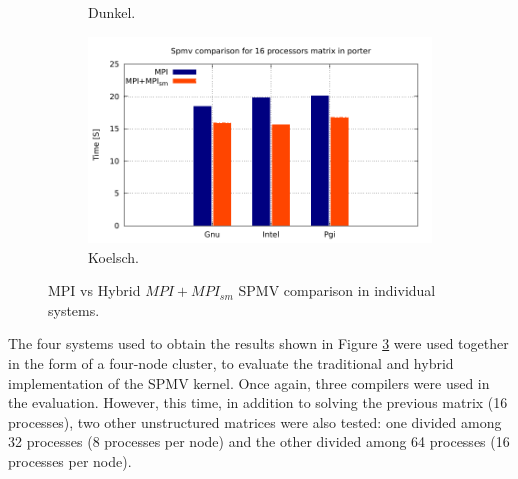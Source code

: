 \begin{figure} [h!]
\begin{subfigure}{.6\textwidth}
      \caption[]{Dunkel.}
      \label{fig:HybridDunkel}
    \end{subfigure}%
    \begin{subfigure}{.6\textwidth}
      \centering
      \hspace*{-1.5cm} 
      \includegraphics[page=4, width=0.95\linewidth]{Plots/HybridProgramming/spmvIndividual.pdf}
      \caption{Koelsch.}
      \label{fig:HybridKoelsh}
    \end{subfigure}
\caption{MPI vs Hybrid $MPI+MPI_{sm}$ SPMV comparison in individual systems.}
\label{fig:spmvIndividual}
\end{figure}


\medskip

The four systems used to obtain the results shown in Figure \ref{fig:spmvIndividual} were used together in the form of a four-node cluster, to evaluate the traditional and hybrid implementation of the SPMV kernel. Once again, three compilers were used in the evaluation. However, this time, in addition to solving the previous matrix (16 processes), two other unstructured matrices were also tested: one divided among 32 processes (8 processes per node) and the other divided among 64 processes (16 processes per node). 



